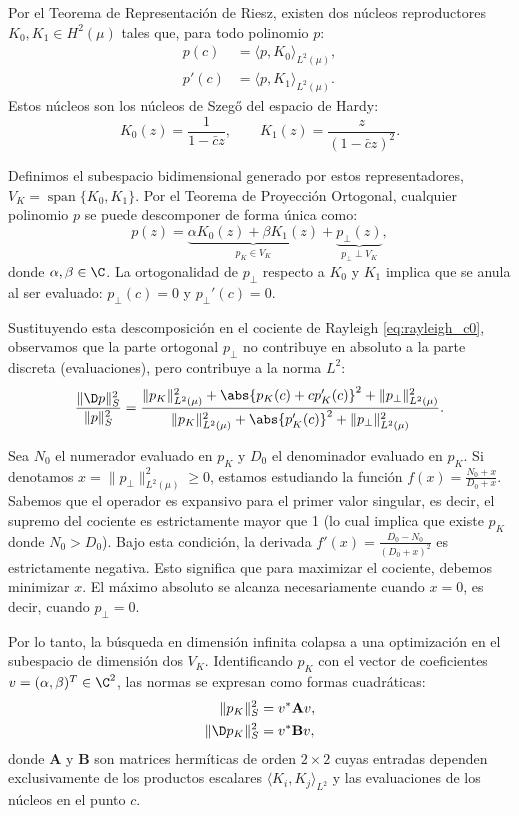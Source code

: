 Por el Teorema de Representación de Riesz, existen dos núcleos reproductores $K_0, K_1 \in H^2(\mu)$ tales que, para todo polinomio $p$:
\begin{align*}
	p(c)  & = \langle p, K_0 \rangle_{L^2(\mu)}, \\
	p'(c) & = \langle p, K_1 \rangle_{L^2(\mu)}.
\end{align*}
Estos núcleos son los núcleos de Szegő del espacio de Hardy:
\begin{equation}\label{eq:nucleos_szego}
	K_0(z) = \frac{1}{1-\bar{c}z}, \qquad K_1(z) = \frac{z}{(1-\bar{c}z)^2}.
\end{equation}

Definimos el subespacio bidimensional generado por estos representadores, $V_K = \operatorname{span}\{K_0, K_1\}$. Por el Teorema de Proyección Ortogonal, cualquier polinomio $p$ se puede descomponer de forma única como:
\[ p(z) = \underbrace{\alpha K_0(z) + \beta K_1(z)}_{p_K \in V_K} + \underbrace{p_{\perp}(z)}_{p_{\perp} \perp V_K}, \]
donde $\alpha, \beta \in \C$. La ortogonalidad de $p_{\perp}$ respecto a $K_0$ y $K_1$ implica que se anula al ser evaluado: $p_{\perp}(c) = 0$ y $p_{\perp}'(c) = 0$.

Sustituyendo esta descomposición en el cociente de Rayleigh \eqref{eq:rayleigh_c0}, observamos que la parte ortogonal $p_{\perp}$ no contribuye en absoluto a la parte discreta (evaluaciones), pero contribuye a la norma $L^2$:
\[ \frac{\|\D p\|_S^2}{\|p\|_S^2} = \frac{\|p_K\|_{L^2(\mu)}^2 + \abs{p_K(c) + c p_K'(c)}^2 + \|p_{\perp}\|_{L^2(\mu)}^2}{\|p_K\|_{L^2(\mu)}^2 + \abs{p_K'(c)}^2 + \|p_{\perp}\|_{L^2(\mu)}^2}. \]

Sea $N_0$ el numerador evaluado en $p_K$ y $D_0$ el denominador evaluado en $p_K$. Si denotamos $x = \|p_{\perp}\|_{L^2(\mu)}^2 \geq 0$, estamos estudiando la función $f(x) = \frac{N_0 + x}{D_0 + x}$. Sabemos que el operador es expansivo para el primer valor singular, es decir, el supremo del cociente es estrictamente mayor que 1 (lo cual implica que existe $p_K$ donde $N_0 > D_0$). Bajo esta condición, la derivada $f'(x) = \frac{D_0 - N_0}{(D_0 + x)^2}$ es estrictamente negativa. Esto significa que para maximizar el cociente, debemos minimizar $x$. El máximo absoluto se alcanza necesariamente cuando $x = 0$, es decir, cuando $p_{\perp} = 0$.

Por lo tanto, la búsqueda en dimensión infinita colapsa a una optimización en el subespacio de dimensión dos $V_K$. Identificando $p_K$ con el vector de coeficientes $v = (\alpha, \beta)^T \in \C^2$, las normas se expresan como formas cuadráticas:
\begin{align*}
	\|p_K\|_S^2    & = v^* \mathbf{A} v, \\
	\|\D p_K\|_S^2 & = v^* \mathbf{B} v,
\end{align*}
donde $\mathbf{A}$ y $\mathbf{B}$ son matrices hermíticas de orden $2 \times 2$ cuyas entradas dependen exclusivamente de los productos escalares $\langle K_i, K_j \rangle_{L^2}$ y las evaluaciones de los núcleos en el punto $c$.

